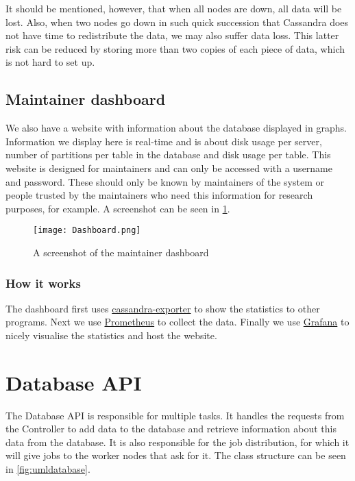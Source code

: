 \documentclass[../Main.tex]{subfiles}
\begin{document}
It should be mentioned, however, that when all nodes are down, all data will be lost. Also, when two nodes go down in such quick succession that Cassandra does not have time to redistribute the data, we may also suffer data loss. This latter risk can be reduced by storing more than two copies of each piece of data, which is not hard to set up. 

\subsection{Maintainer dashboard}
We also have a website with information about the database displayed in graphs. Information we display here is real-time and is about disk usage per server, number of partitions per table in the database and disk usage per table. This website is designed for maintainers and can only be accessed with a username and password. These should only be known by maintainers of the system or people trusted by the maintainers who need this information for research purposes, for example. A screenshot can be seen in \cref{fig:dashboard}.
\begin{figure}
    \centering
    \texttt{[image: Dashboard.png]}
    \caption{A screenshot of the maintainer dashboard}
    \label{fig:dashboard}
\end{figure}

\subsubsection{How it works}
The dashboard first uses \href{https://github.com/instaclustr/cassandra-exporter}{cassandra-exporter} to show the statistics to other programs. Next we use \href{https://prometheus.io/}{Prometheus} to collect the data. Finally we use \href{https://grafana.com/}{Grafana} to nicely visualise the statistics and host the website.

\section{Database API}
The Database API is responsible for multiple tasks. It handles the requests from the Controller to add data to the database and retrieve information about this data from the database. It is also responsible for the job distribution, for which it will give jobs to the worker nodes that ask for it. The class structure can be seen in \cref{fig:umldatabase}.\\
\end{document}
